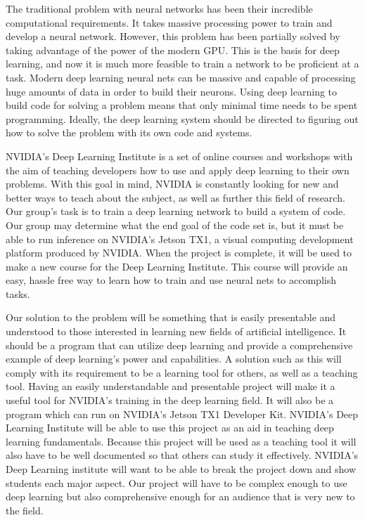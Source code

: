 \documentclass[letterpaper,10pt]{article}
\begin{document}
The traditional problem with neural networks has been their incredible computational requirements.
 It takes massive processing power to train and develop a neural network.
 However, this problem has been partially solved by taking advantage of the power of the modern GPU.
 This is the basis for deep learning, and now it is much more feasible to train a network to be proficient at a task.
 Modern deep learning neural nets can be massive and capable of processing huge amounts of data in order to build their neurons.
 Using deep learning to build code for solving a problem means that only minimal time needs to be spent programming.
 Ideally, the deep learning system should be directed to figuring out how to solve the problem with its own code and systems.


NVIDIA’s Deep Learning Institute is a set of online courses and workshops with the aim of teaching developers how to use and apply deep learning to their own problems.
 With this goal in mind, NVIDIA is constantly looking for new and better ways to teach about the subject, as well as further this field of research.
 Our group’s task is to train a deep learning network to build a system of code.
 Our group may determine what the end goal of the code set is, but it must be able to run inference on NVIDIA’s Jetson TX1, a visual computing development platform produced by NVIDIA.
 When the project is complete, it will be used to make a new course for the Deep Learning Institute.
 This course will provide an easy, hassle free way to learn how to train and use neural nets to accomplish tasks.


Our solution to the problem will be something that is easily presentable and understood to those interested in learning new fields of artificial intelligence.
 It should be a program that can utilize deep learning and provide a comprehensive example of deep learning's power and capabilities.
 A solution such as this will comply with its requirement to be a learning tool for others, as well as a teaching tool.
 Having an easily understandable and presentable project will make it a useful tool for NVIDIA's training in the deep learning field.
 It will also be a program which can run on NVIDIA's Jetson TX1 Developer Kit.
 NVIDIA's Deep Learning Institute will be able to use this project as an aid in teaching deep learning fundamentals.
 Because this project will be used as a teaching tool it will also have to be well documented so that others can study it effectively.
 NVIDIA's Deep Learning institute will want to be able to break the project down and show students each major aspect.
 Our project will have to be complex enough to use deep learning but also comprehensive enough for an audience that is very new to the field.
\end{document}
